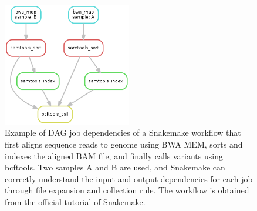 \begin{figure}[!htbp]
\centering
\includegraphics[width=0.5\textwidth]{images/snakemake_dag}
\caption[Example of DAG job dependencies of a Snakemake workflow]{
    Example of DAG job dependencies of a Snakemake workflow that first aligns
    sequence reads to genome using BWA MEM, sorts and indexes the aligned BAM
    file, and finally calls variants using bcftools. Two samples A and B are
    used, and Snakemake can correctly understand the input and output
    dependencies for each job through file expansion and collection rule. The
    workflow is obtained from
    \href{http://snakemake.bitbucket.org/snakemake-tutorial.html}
    {the official tutorial of Snakemake}.
}
\label{fig:snakemake-dag}
\end{figure}



